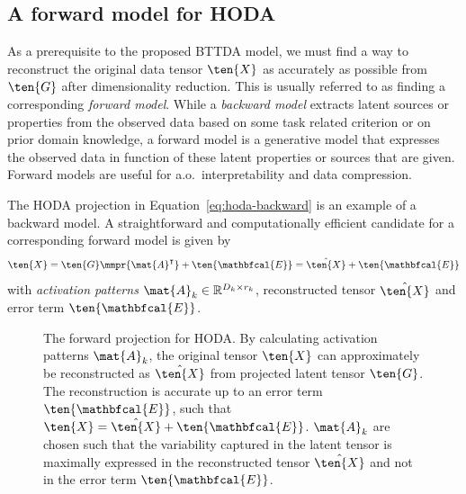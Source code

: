 \subsection{A forward model for HODA}
As a prerequisite to the proposed BTTDA model, we must find a
way to reconstruct the original data tensor $\ten{X}$ as accurately as possible
from $\ten{G}$ after dimensionality reduction.
This is usually referred to as finding a corresponding \emph{forward model}.
While a \emph{backward model} extracts latent sources or properties from the observed
data based on some task related criterion or on prior domain knowledge,
a forward model is a generative model that expresses the observed data in
function of these latent properties or sources that are given.
Forward models are useful for a.o.\ interpretability and data compression.

The HODA projection in Equation~\ref{eq:hoda-backward} is an example
of a backward model.
A straightforward and computationally efficient candidate for a corresponding
forward model is given by
\begin{equation}
  \ten{X} = \ten{G}\mmpr{\mat{A}^\intercal} + \ten{\mathbfcal{E}} =
  \hat{\ten{X}} + \ten{\mathbfcal{E}}
	\label{eq:HODA-forward}
\end{equation}
with \emph{activation patterns} $\mat{A}_k \in \mathbb{R}^{D_k\times r_k}$,
reconstructed tensor $\hat{\ten{X}}$ and error term $\ten{\mathbfcal{E}}$.
\begin{figure}[t]
	\centering
	
  \caption[The \ac{hoda} forward projection.]{The forward projection for HODA.
    By calculating activation	patterns $\mat{A}_k$, the original tensor $\ten{X}$ can approximately be
    reconstructed as $\hat{\ten{X}}$ from projected latent tensor $\ten{G}$.
    The reconstruction is accurate up to an error term $\ten{\mathbfcal{E}}$,
    such that $\ten{X}=\hat{\ten{X}}+\ten{\mathbfcal{E}}$.
    $\mat{A}_k$ are chosen such that the variability captured in the latent tensor is
    maximally expressed in the reconstructed tensor $\hat{\ten{X}}$ and not in
    the error term $\ten{\mathbfcal{E}}$.}
	\label{fig:HODA-forward}
\end{figure}

